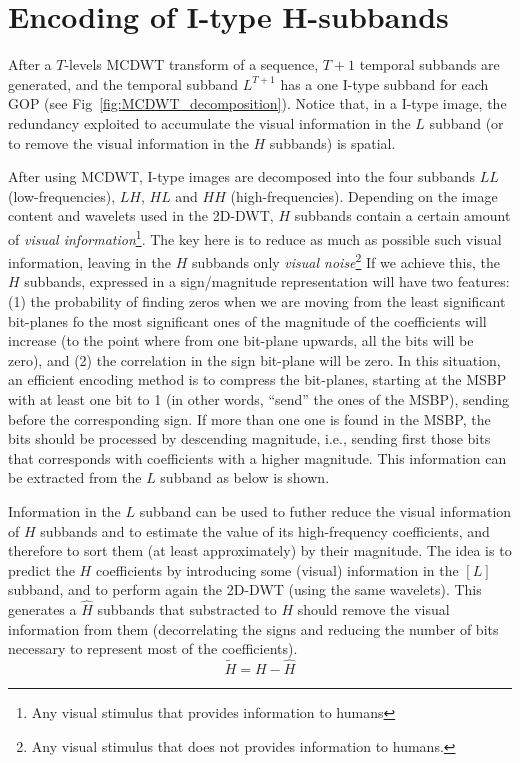 
\section{Encoding of I-type H-subbands}

After a $T$-levels MCDWT transform of a sequence, $T+1$ temporal
subbands are generated, and the temporal subband $L^{T+1}$ has a one
I-type subband for each GOP (see
Fig~\ref{fig:MCDWT_decomposition}). Notice that, in a I-type image,
the redundancy exploited to accumulate the visual information in the
$L$ subband (or to remove the visual information in the $H$ subbands)
is spatial.

After using MCDWT, I-type images are decomposed into
the four subbands $LL$ (low-frequencies), $LH$, $HL$ and $HH$
(high-frequencies). Depending on the image content and wavelets used
in the 2D-DWT, $H$ subbands contain a certain amount of \emph{visual
  information}\footnote{Any visual stimulus that provides information
  to humans}. The key here is to reduce as much as possible such
visual information, leaving in the $H$ subbands only \emph{visual
  noise}\footnote{Any visual stimulus that does not provides
  information to humans.} If we achieve this, the $H$ subbands,
expressed in a sign/magnitude representation will have two features:
(1) the probability of finding zeros when we are moving from the least
significant bit-planes fo the most significant ones of the magnitude
of the coefficients will increase (to the point where from one
bit-plane upwards, all the bits will be zero), and (2) the correlation
in the sign bit-plane will be zero. In this situation, an efficient
encoding method is to compress the bit-planes, starting at the MSBP
with at least one bit to 1 (in other words, ``send'' the ones of the
MSBP), sending before the corresponding sign. If more than one one is
found in the MSBP, the bits should be processed by descending
magnitude, i.e., sending first those bits that corresponds with
coefficients with a higher magnitude. This information can be
extracted from the $L$ subband as below is shown.

Information in the $L$ subband can be used to futher reduce the visual
information of $H$ subbands and to estimate the value of its
high-frequency coefficients, and therefore to sort them (at least
approximately) by their magnitude. The idea is to predict the $H$
coefficients by introducing some (visual) information in the $[L]$
subband, and to perform again the 2D-DWT (using the same
wavelets). This generates a $\hat{H}$ subbands that substracted to $H$
should remove the visual information from them (decorrelating the
signs and reducing the number of bits necessary to represent most of
the coefficients).
\begin{equation}
  \tilde{H} = H - \hat{H}
\end{equation}

